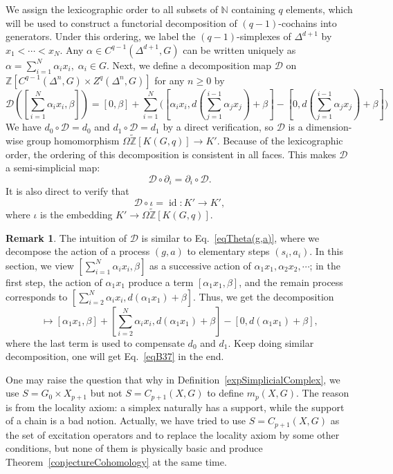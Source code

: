 \documentclass[reprint, amsmath, amssymb, showpacs, floatfix, longbibliography, aps, twocolumn, superscriptaddress, nofootinbib]{revtex4-2}
\newcommand{\NN}{{\mathbb N}}
\newcommand{\ZZ}{{\mathbb Z}}
\newcommand{\tZ}{{\widetilde{\mathbb Z}}}
\newcommand{\id}{{\operatorname{id}}}
\theoremstyle{definition}
\newtheorem{remark}{Remark}[section]
\begin{document}
We assign the lexicographic order to all subsets of $\NN$ containing $q$ elements, which will be used to construct a functorial decomposition of $(q-1)$-cochains into generators. Under this ordering, 
 we label the $(q-1)$-simplexes of $\Delta^{d+1}$ by $x_1<\cdots<x_N$. Any $\alpha\in C^{q-1}(\Delta^{d+1},G)$ can be written uniquely as $\alpha=\sum_{i=1}^N \alpha_ix_i,\;\alpha_i\in G$. Next, we define a decomposition map $\mathcal{D}$ on $\ZZ[C^{q-1}(\Delta^n,G)\times Z^q(\Delta^n,G)]$ for any $n\ge 0$ by
 \begin{equation}\label{eqB37}
 	\mathcal{D}([\sum_{i=1}^N \alpha_ix_i,\beta])=[0,\beta]+\sum_{i=1}^N\bigg([\alpha_ix_i,d(\sum_{j=1}^{i-1}\alpha_jx_j)+\beta]-[0,d(\sum_{j=1}^{i-1}\alpha_jx_j)+\beta]\bigg)
 \end{equation}
 We have $d_0\circ\mathcal{D}=d_0$ and $d_1\circ\mathcal{D}=d_1$ by a direct verification, so $\mathcal{D}$ is a dimension-wise group homomorphism $\Omega\tZ[K(G,q)]\rightarrow K'$. Because of the lexicographic order, the ordering of this decomposition is consistent in all faces. This makes $\mathcal{D}$ a semi-simplicial map:
 \begin{equation}
 	\mathcal{D}\circ \partial_i=\partial_i\circ \mathcal{D}.
 \end{equation}
 It is also direct to verify that
 \begin{equation}
 	\mathcal{D}\circ \iota=\id: K'\rightarrow K',
 \end{equation}
 where $\iota$ is the embedding $K'\rightarrow \Omega\tZ[K(G,q)]$.
 
 \begin{remark}\label{remarkDecomposition}
 	The intuition of $\mathcal{D}$ is similar to Eq.~\eqref{eqTheta(g,a)}, where we decompose the action of a process $(g,a)$ to elementary steps $(s_i,a_i)$. In this section, we view $[\sum_{i=1}^N\alpha_ix_i,\beta]$ as a successive action of $\alpha_1x_1,\alpha_2x_2,\cdots$; in the first step, the action of $\alpha_1x_1$ produce a term $[\alpha_1x_1,\beta]$, and the remain process corresponds to $[\sum_{i=2}^N\alpha_ix_i,d(\alpha_1x_1)+\beta]$. Thus, we get the decomposition
 	\begin{equation}
 		[\sum_{i=1}^N \alpha_ix_i,\beta]\mapsto [\alpha_1x_1,\beta]+[\sum_{i=2}^N\alpha_ix_i,d(\alpha_1x_1)+\beta]-[0,d(\alpha_1x_1)+\beta],
 	\end{equation}
 	where the last term is used to compensate $d_0$ and $d_1$. Keep doing similar decomposition, one will get Eq.~\eqref{eqB37} in the end.
 	
 	One may raise the question that why in Definition~\ref{expSimplicialComplex}, we use $S=G_0\times X_{p+1}$ but not $S=C_{p+1}(X,G)$ to define $m_p(X,G)$. The reason is from the locality axiom: a simplex naturally has a support, while the support of a chain is a bad notion. Actually, we have tried to use $S=C_{p+1}(X,G)$ as the set of excitation operators and to replace the locality axiom by some other conditions, but none of them is physically basic and produce Theorem~\ref{conjectureCohomology} at the same time.
 \end{remark}
 
\end{document}
